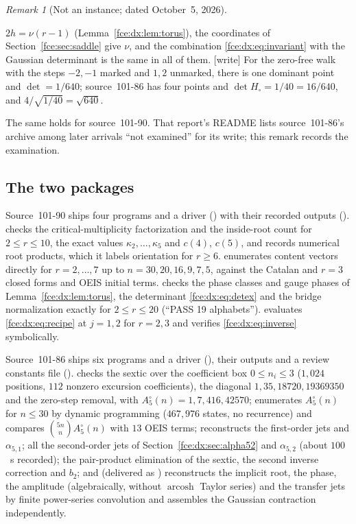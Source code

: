 \documentclass[11pt,a4paper]{article}
\numberwithin{equation}{section}
\theoremstyle{definition}\newtheorem{definition}[theorem]{Definition}
\theoremstyle{remark}\newtheorem{remark}[theorem]{Remark}
\begin{document}
\begin{remark}[Not an instance; dated October~5, 2026]
\begin{enumerate}[label=(\roman*)]
$2h=\nu(r-1)$ (Lemma~\ref{fce:dx:lem:torus}), the coordinates of
Section~\ref{fce:sec:saddle} give $\nu$, and the combination
\eqref{fce:dx:eq:invariant} with the Gaussian determinant is the same in all
of them. \textup{[write]} For the zero-free walk with the steps $-2,-1$ marked
and $1,2$ unmarked, there is one dominant point and $\det=1/640$; source~101-86
has four points and $\det H_\circ=1/40=16/640$, and $4/\sqrt{1/40}=\sqrt{640}$.
\end{enumerate}
The same holds for source~101-90. That report's README lists source~101-86's
archive among later arrivals ``not examined'' for its write; this remark
records the examination.
\end{remark}

\subsection{The two packages}\label{fce:dx:sec:checks}
Source~101-90 ships four programs and a driver
() with their recorded outputs
().  checks the
critical-multiplicity factorization and the inside-root count for
$2\le r\le10$, the exact values $\kappa_2,\ldots,\kappa_5$ and $c(4)$, $c(5)$,
and records numerical root products, which it labels orientation for $r\ge6$.
 enumerates content vectors directly for
$r=2,\ldots,7$ up to $n=30,20,16,9,7,5$, against the Catalan and $r=3$ closed
forms and OEIS initial terms.  checks the phase classes
and gauge phases of Lemma~\ref{fce:dx:lem:torus}, the determinant
\eqref{fce:dx:eq:detex} and the bridge normalization exactly for $2\le r\le20$
(``PASS 19 alphabets'').  evaluates
\eqref{fce:dx:eq:recipe} at $j=1,2$ for $r=2,3$ and verifies
\eqref{fce:dx:eq:inverse} symbolically.

Source~101-86 ships six programs and a driver (),
their outputs and a review constants file ().
 checks the sextic over the coefficient box
$0\le n_i\le3$ ($1{,}024$ positions, $112$ nonzero excursion coefficients),
the diagonal $1,35,18720,19369350$ and the zero-step removal, with
$A^\circ_5(n)=1,7,416,42570$;  enumerates
$A^\circ_5(n)$ for $n\le30$ by dynamic programming ($467{,}976$ states, no
recurrence) and compares $\binom{5n}nA^\circ_5(n)$ with $13$ OEIS terms;
 reconstructs the first-order jets and $\alpha_{5,1}$;
 all the second-order jets of
Section~\ref{fce:dx:sec:alpha52} and $\alpha_{5,2}$ (about $100$~s recorded);
 the pair-product elimination of the sextic, the
second inverse correction and $b_2$; and
 (delivered as
) reconstructs the implicit
root, the phase, the amplitude (algebraically, without $\operatorname{arcosh}$
Taylor series) and the transfer jets by finite power-series convolution and
assembles the Gaussian contraction independently.
\end{document}
